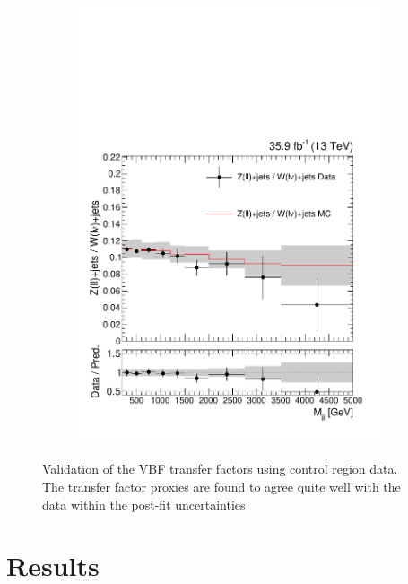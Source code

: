 \begin{figure}[]
\begin{center}
\begin{subfigure}[t]{0.32\textwidth}
            \includegraphics[width=\textwidth]{figures/vbf/fits/combined_combinedW_cat_vbf_ratio.pdf}
        \end{subfigure}
        \caption{Validation of the VBF transfer factors using control region data. 
                 The transfer factor proxies are found to agree quite well with the data within the post-fit uncertainties}
        \label{fig:vbf:valid}
    \end{center}
\end{figure}


\section{Results}

